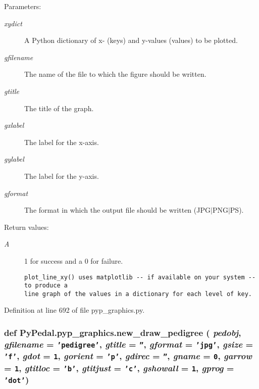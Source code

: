 \begin{Desc}
\item[Parameters:]
\begin{description}
\item[{\em xydict}]A Python dictionary of x- (keys) and y-values (values) to be plotted. \item[{\em gfilename}]The name of the file to which the figure should be written. \item[{\em gtitle}]The title of the graph. \item[{\em gxlabel}]The label for the x-axis. \item[{\em gylabel}]The label for the y-axis. \item[{\em gformat}]The format in which the output file should be written (JPG$|$PNG$|$PS). \end{description}
\end{Desc}
\begin{Desc}
\item[Return values:]
\begin{description}
\item[{\em A}]1 for success and a 0 for failure.

\footnotesize\begin{verbatim}plot_line_xy() uses matplotlib -- if available on your system -- to produce a
line graph of the values in a dictionary for each level of key.
\end{verbatim}
\normalsize
 \end{description}
\end{Desc}


Definition at line 692 of file pyp\_\-graphics.py.\hypertarget{namespacePyPedal_1_1pyp__graphics_d1890710e78d0f63351d24e84527c570}{
\subsubsection[new\_\-draw\_\-pedigree]{\setlength{\rightskip}{0pt plus 5cm}def Py\-Pedal.pyp\_\-graphics.new\_\-draw\_\-pedigree ( {\em pedobj},  {\em gfilename} = {\tt 'pedigree'},  {\em gtitle} = {\tt ''},  {\em gformat} = {\tt 'jpg'},  {\em gsize} = {\tt 'f'},  {\em gdot} = {\tt 1},  {\em gorient} = {\tt 'p'},  {\em gdirec} = {\tt ''},  {\em gname} = {\tt 0},  {\em garrow} = {\tt 1},  {\em gtitloc} = {\tt 'b'},  {\em gtitjust} = {\tt 'c'},  {\em gshowall} = {\tt 1},  {\em gprog} = {\tt 'dot'})}}
\label{namespacePyPedal_1_1pyp__graphics_d1890710e78d0f63351d24e84527c570}


